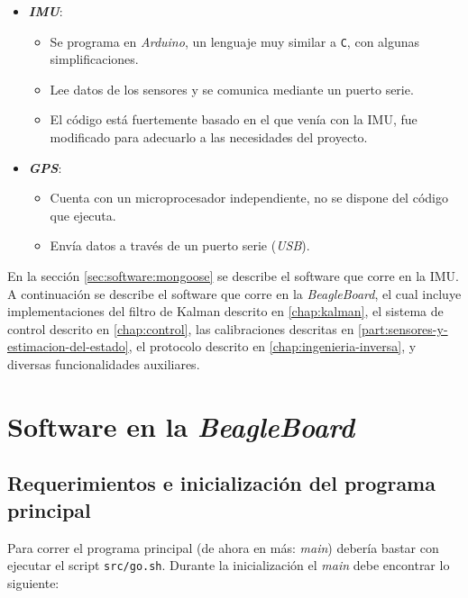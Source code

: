 \documentclass[main]{subfiles}
\begin{document}
\begin{itemize}
\item \textbf{\textit{IMU}}:
  \begin{itemize}
  \item Se programa en \textit{Arduino}, un lenguaje muy similar a \verb+C+, con algunas simplificaciones.
  \item Lee datos de los sensores y se comunica mediante un puerto serie.
  \item El c\'odigo est\'a fuertemente basado en el que ven\'ia con la IMU, fue modificado para adecuarlo a las necesidades del proyecto.
  \end{itemize}
\item \textbf{\textit{GPS}}:
  \begin{itemize}
  \item Cuenta con un microprocesador independiente, no se dispone del c\'odigo que ejecuta.
  \item Env\'ia datos a trav\'es de un puerto serie (\textit{USB}).
  \end{itemize}
\end{itemize}

En la secci\'on \ref{sec:software:mongoose} se describe el software que corre en la IMU. A continuaci\'on se describe el software que corre en la \textit{BeagleBoard}, el cual incluye implementaciones del filtro de Kalman descrito en \ref{chap:kalman}, el sistema de control descrito en \ref{chap:control}, las calibraciones descritas en \ref{part:sensores-y-estimacion-del-estado}, el protocolo descrito en \ref{chap:ingenieria-inversa}, y diversas funcionalidades auxiliares.

\section{Software en la \textit{BeagleBoard}}

\subsection{Requerimientos e inicializaci\'on del programa principal}
\label{sec:software-init}

Para correr el programa principal (de ahora en más: \textit{main}) deber\'ia bastar con ejecutar el script \verb+src/go.sh+. Durante la inicializaci\'on el \textit{main} debe encontrar lo siguiente:\newline
\vspace{-20pt}
\end{document}
